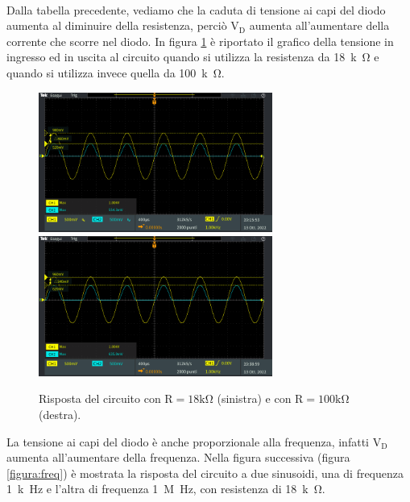 \documentclass{report}
\begin{document}
\\Dalla tabella precedente, vediamo che la caduta di tensione ai capi del diodo aumenta al diminuire della resistenza, perciò $\mathrm{V_D}$ aumenta all'aumentare della corrente che scorre nel diodo. In figura \ref{figura:res} è riportato il grafico della tensione in ingresso ed in uscita al circuito quando si utilizza la resistenza da \SI{18}{k\ohm} e quando si utilizza invece quella da \SI{100}{k\ohm}.\par
\begin{figure}[h!]
\centering
\includegraphics[height=4.6cm]{immagini/TEK00000}
\includegraphics[height=4.6cm]{immagini/TEK00003}
\caption{Risposta del circuito con $\mathrm{R=18k\Omega}$ (sinistra) e con $\mathrm{R=100k\Omega}$ (destra).}
	\label{figura:res}
\end{figure}
\noindent La tensione ai capi del diodo è anche proporzionale alla frequenza, infatti $\mathrm{V_D}$ aumenta all'aumentare della frequenza. Nella figura successiva (figura \ref{figura:freq}) è mostrata la risposta del circuito a due sinusoidi, una di frequenza \SI{1}{k\hertz} e l'altra di frequenza \SI{1}{M\hertz}, con resistenza di \SI{18}{k\ohm}.
\end{document}
